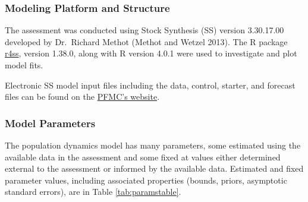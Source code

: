 \documentclass[11pt,
  english,
]{article}
\begin{document}

\hypertarget{modeling-platform-and-structure}{%
\subsubsection{Modeling Platform and Structure}\label{modeling-platform-and-structure}}

\leavevmode\tagmcend\tagstructend

The assessment was conducted using Stock Synthesis (SS) version 3.30.17.00 developed by Dr.~Richard Methot {(Methot and Wetzel 2013)\leavevmode\tagmcend\tagstructend}. The R package {\href{https://github.com/r4ss/r4ss}{r4ss}\leavevmode\tagmcend\tagstructend}, version 1.38.0, along with R version 4.0.1 were used to investigate and plot model fits.

Electronic SS model input files including the data, control, starter, and forecast files can be found on the {\href{https://www.pcouncil.org/groundfish/stock-assessments/}{PFMC's website}\leavevmode\tagmcend\tagstructend}.


\hypertarget{model-parameters}{%
\subsubsection{Model Parameters}\label{model-parameters}}

\leavevmode\tagmcend\tagstructend

The population dynamics model has many parameters, some estimated using the available data in the assessment and some fixed at values either determined external to the assessment or informed by the available data. Estimated and fixed parameter values, including associated properties (bounds, priors, asymptotic standard errors), are in Table \ref{tab:paramstable}.
\end{document}
